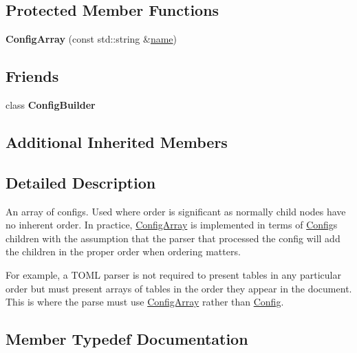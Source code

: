 \subsection*{Protected Member Functions}
\begin{DoxyCompactItemize}
\item 
\mbox{\label{classtheoria_1_1config_1_1ConfigArray_a9086dda6fa6d659256f50be797dfe719}} 
{\bfseries Config\+Array} (const std\+::string \&\hyperlink{classtheoria_1_1config_1_1Config_af4929f1c9b86576fdc439051a10f89cd}{name})
\end{DoxyCompactItemize}
\subsection*{Friends}
\begin{DoxyCompactItemize}
\item 
\mbox{\label{classtheoria_1_1config_1_1ConfigArray_a3d61732fded713b38fc7f9fe3d80e2ae}} 
class {\bfseries Config\+Builder}
\end{DoxyCompactItemize}
\subsection*{Additional Inherited Members}


\subsection{Detailed Description}
An array of configs. Used where order is significant as normally child nodes have no inherent order. In practice, \hyperlink{classtheoria_1_1config_1_1ConfigArray}{Config\+Array} is implemented in terms of \hyperlink{classtheoria_1_1config_1_1Config}{Config}\textquotesingle{}s children with the assumption that the parser that processed the config will add the children in the proper order when ordering matters.

For example, a T\+O\+ML parser is not required to present tables in any particular order but must present arrays of tables in the order they appear in the document. This is where the parse must use \hyperlink{classtheoria_1_1config_1_1ConfigArray}{Config\+Array} rather than \hyperlink{classtheoria_1_1config_1_1Config}{Config}. 

\subsection{Member Typedef Documentation}
\mbox{\label{classtheoria_1_1config_1_1ConfigArray_ace80948768681e7eb033825f4fe761f2}} 
